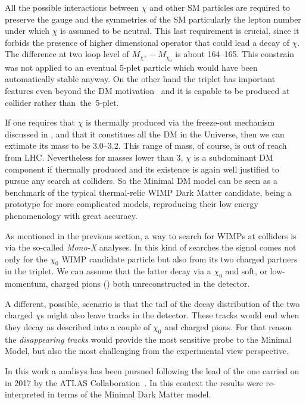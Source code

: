 All the possible interactions between $\chi$ and other SM particles are required to preserve the gauge and the symmetries of the SM particularly the lepton number under which $\chi$ is assumed to be neutral. This last requirement is crucial, since it forbids the presence of higher dimensional operator that could lead a decay of $\chi$.  The difference at two loop level of $M_{\chi^\pm} - M_{\chi_0}$ is  about \SIrange{164}{165}{\mev}. This constrain was not applied to an eventual 5-plet particle which would have been automatically stable anyway. On the other hand the triplet has important features even beyond the DM motivation~\cite{Cirelli:paper} and it is capable to be produced at collider rather \mbox{than the 5-plet}.

If one requires that $\chi$ is thermally produced via the freeze-out mechanism discussed in \Sect{\ref{sec:wimp}}, and that it constitues all the DM in the Universe, then we can extimate its mass to be \SIrange{3.0}{3.2}{\tev}. This range of mass, of course, is out of reach from LHC. Nevertheless for masses lower than \SI{3}{\tev}, $\chi$ is a subdominant DM component if thermally produced and its existence is again well justified to pursue any search at colliders. So the Minimal DM model can be seen as a benchmark of the typical thermal-relic WIMP Dark Matter candidate, being a prototype for more complicated models, reproducing their low energy phenomenology with great accuracy.

As mentioned in the previous section, a way to search for WIMPs at colliders is via the so-called \emph{Mono-X} analyses. In this kind of searches the signal comes not only for the $\chi_0$ WIMP candidate particle but also from its two charged partners in the triplet. We can assume that the latter decay via a $\chi_0$ and soft, or low-momentum, charged pions (\pipm) both unreconstructed in the detector. 

A different, possible, scenario is that the tail of the decay distribution of the two charged $\chi$s might also leave tracks in the detector. These tracks would end when they decay as described into a couple of $\chi_0$ and charged pions. For that reason the \emph{disappearing tracks} would provide the most sensitive probe to the Minimal Model, but also the most challenging from the experimental view perspective.

\smallskip
In this work a \mph analisys has been pursued following the lead of the one carried on in 2017 by the ATLAS Collaboration~\cite{paperMP}. In this context the \mph results were re-interpreted in terms of the Minimal Dark Matter model.











